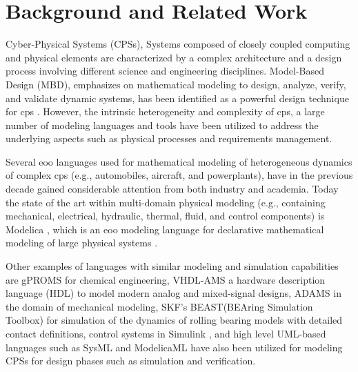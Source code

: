 

\chapter{Background and Related Work}
\label{cha:background}

Cyber-Physical Systems (CPSs), Systems composed of closely coupled computing and physical elements are characterized by a complex architecture and a design process involving different science and engineering disciplines. Model-Based Design (MBD), emphasizes on mathematical modeling to design, analyze, verify, and validate dynamic systems,  has been identified as a powerful design technique for \acrshort{cps} \cite{mbsdbalasubramanian,mbsdbrooks,mbsdkarasi}. However, the intrinsic heterogeneity and complexity of \acrshort{cps}, a large number of modeling languages and tools have been utilized to address the underlying aspects such as physical processes and requirements management.

Several \acrshort{eoo} languages used for mathematical modeling of heterogeneous dynamics of complex \acrshort{cps} (e.g., automobiles, aircraft, and powerplants), have in the previous decade gained considerable attention from both industry and academia. Today the state of the art within multi-domain physical modeling (e.g., containing mechanical, electrical, hydraulic, thermal, fluid, and control components) is Modelica \cite{modelica}, which is an \acrshort{eoo} modeling language for declarative mathematical modeling of large physical systems \cite{modelicahilding,modelicapeter,modelicapeterbook,modelicatiller}. 

Other examples of languages with similar modeling and simulation capabilities are gPROMS \cite{gproms,gpromsbarton,gpromsoh,gpromspaulphd} for chemical engineering, VHDL-AMS \cite{vhdlamsernst,vhdlamsieee} a hardware description language (HDL) to model modern analog and mixed-signal designs, ADAMS \cite{adams} in the domain of mechanical modeling, SKF’s BEAST(BEAring Simulation Toolbox) \cite{beast} for simulation of the dynamics of rolling bearing  models with detailed contact definitions, control systems in Simulink \cite{simulink}, and  high level UML-based languages such as SysML \cite{sysml,sysmlmorgan} and ModelicaML \cite{modelicaml,modelicamlreport,modelicamlverification,modelicamlwladimir} have also been utilized for modeling CPSs  for design phases such as simulation and verification.

